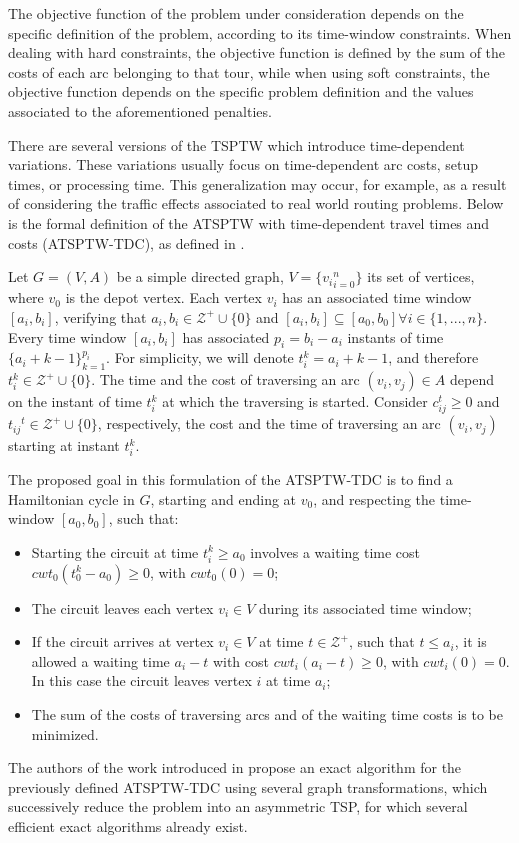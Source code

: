 The objective function of the problem under consideration depends on the specific definition of the problem, according to its time-window constraints. When dealing with hard constraints, the objective function is defined by the sum of the costs of each arc belonging to that tour, while when using soft constraints, the objective function depends on the specific problem definition and the values associated to the aforementioned penalties.

There are several versions of the TSPTW which introduce time-dependent variations. These variations usually focus on time-dependent arc costs, setup times, or processing time. This generalization may occur, for example, as a result of considering the traffic effects associated to real world routing problems. Below is the formal definition of the ATSPTW with time-dependent travel times and costs (ATSPTW-TDC), as defined in \cite{tsptw_exact}.

Let $G= (V,A)$ be a simple directed graph, $V=\{{v_{i}}_{i=0}^{n}\}$ its set of vertices, where $v_0$ is the depot vertex. Each vertex $v_i$ has an associated time window $[a_{i}, b_{i}]$, verifying that $a_i, b_i \in \mathcal{Z}^+ \cup \{0\}$ and $[a_{i}, b_{i}] \subseteq [a_{0}, b_{0}] \forall i \in \{1,...,n\}$. Every time window $[a_{i}, b_{i}]$ has associated $p_i = b_i - a_i$ instants of time $\{a_i + k -1\}_{k=1}^{p_{i}}$. For simplicity, we will denote $t_{i}^{k} = a_i + k -1$, and therefore $t_{i}^{k} \in \mathcal{Z}^+ \cup \{0\}$. The time and the cost of traversing an arc $(v_i, v_j) \in A$ depend on the instant of time $t_{i}^{k}$ at which the traversing is started. Consider $c_{ij}^{t} \geq 0$ and $t_{ij}{^t} \in \mathcal{Z}^+ \cup \{0\}$, respectively, the cost and the time of traversing an arc $(v_i, v_j)$ starting at instant $t_{i}^{k}$.

The proposed goal in this formulation of the ATSPTW-TDC is to find a Hamiltonian cycle in $G$, starting and ending at $v_0$, and respecting the time-window $[a_0, b_0]$, such that:

\begin{itemize}
  \item Starting the circuit at time $t_{i}^{k} \geq a_0$ involves a waiting time cost $cwt_0(t_{0}^{k}-a_0) \geq 0$, with $cwt_0(0)=0$;
  \item The circuit leaves each vertex $v_i \in V$ during its associated time window;
  \item If the circuit arrives at vertex $v_i \in V$ at time $t \in \mathcal{Z}^+$,
  such that $t \leq a_i$, it is allowed a waiting time $a_i-t$ with cost $cwt_i(a_i-t) \geq 0$, with $cwt_i(0)=0$. In this case the circuit leaves vertex $i$ at time $a_i$;
  \item The sum of the costs of traversing arcs and of the waiting time costs is to be minimized.
\end{itemize}

The authors of the work introduced in \cite{tsptw_exact} propose an exact algorithm for the previously defined ATSPTW-TDC using several graph transformations, which successively reduce the problem into an asymmetric TSP, for which several efficient exact algorithms already exist.


